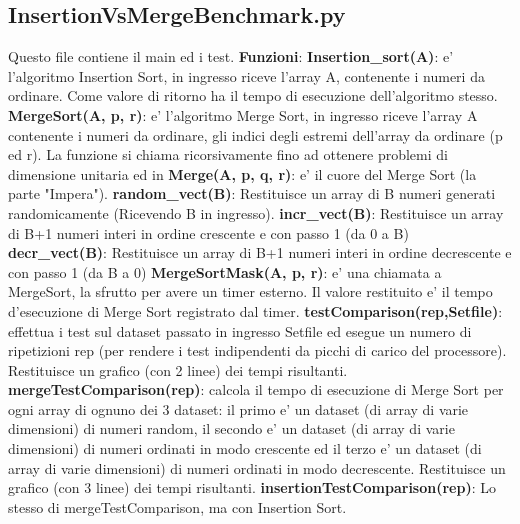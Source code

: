 \documentclass[a4paper]{article}
\begin{document}
\subsection{InsertionVsMergeBenchmark.py}
Questo file contiene il main ed i test.
\newline
\textbf{Funzioni}:
\newline
\textbf{Insertion\_sort(A)}: 
e' l'algoritmo Insertion Sort, in ingresso riceve l'array A, contenente i numeri da ordinare. Come valore di ritorno ha il tempo di esecuzione dell'algoritmo stesso.
\newline
\textbf{MergeSort(A, p, r)}:
e' l'algoritmo Merge Sort, in ingresso riceve l'array A contenente i numeri da ordinare, gli indici degli estremi dell'array da ordinare (p ed r). La funzione si chiama ricorsivamente fino ad ottenere problemi di dimensione unitaria ed in 
\newline
\textbf{Merge(A, p, q, r)}:
e' il cuore del Merge Sort (la parte "Impera").
\newline
\textbf{random\_vect(B)}: Restituisce un array di B numeri generati randomicamente (Ricevendo B in ingresso).  
\newline
\textbf{incr\_vect(B)}: Restituisce un array di B+1 numeri interi in ordine crescente e con passo 1 (da 0 a B)
\newline
\textbf{decr\_vect(B)}: Restituisce un array di B+1 numeri interi in ordine decrescente e con passo 1 (da B a 0)
\newline
\textbf{MergeSortMask(A, p, r)}: e' una chiamata a MergeSort, la sfrutto per avere un timer esterno. Il valore restituito e' il tempo d'esecuzione di Merge Sort registrato dal timer.
\newline
\textbf{testComparison(rep,Setfile)}: effettua i test sul dataset passato in ingresso Setfile ed esegue un numero di ripetizioni rep (per rendere i test indipendenti da picchi di carico del processore). Restituisce un grafico (con 2 linee) dei tempi risultanti.
\newline
\textbf{mergeTestComparison(rep)}: calcola il tempo di esecuzione di Merge Sort per ogni array di ognuno dei 3 dataset: il primo e' un dataset (di  array di varie dimensioni) di numeri random, il secondo e' un dataset (di array di varie dimensioni) di numeri ordinati in modo crescente ed il terzo e' un dataset (di array di varie dimensioni) di numeri ordinati in modo decrescente. Restituisce un grafico (con 3 linee) dei tempi risultanti.    
\newline
\textbf{insertionTestComparison(rep)}: Lo stesso di mergeTestComparison, ma con Insertion Sort.
\end{document}
